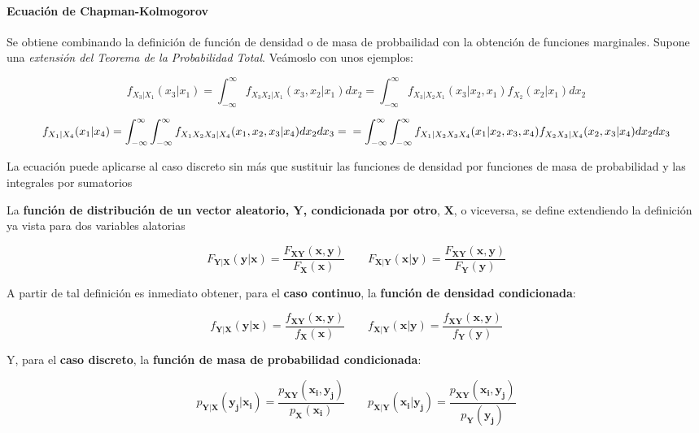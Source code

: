 \documentclass[11pt]{article}
\begin{document}
    \hypertarget{ecuaciuxf3n-de-chapman-kolmogorov}{%
\paragraph{Ecuación de
Chapman-Kolmogorov}\label{ecuaciuxf3n-de-chapman-kolmogorov}}

Se obtiene combinando la definición de función de densidad o de masa de
probbailidad con la obtención de funciones marginales. Supone una
\emph{extensión del Teorema de la Probabilidad Total}. Veámoslo con unos
ejemplos:

\[
f_{X_3 | X_1}(x_3 | x_1) = \int_{-\infty}^{\infty} f_{X_3X_2 | X_1}(x_3, x_2 | x_1) dx_2 =
\int_{-\infty}^{\infty} f_{X_3 | X_2 X_1}(x_3 | x_2 , x_1) f_{X_2}(x_2 | x_1) dx_2
\]

\[
f_{X_1 | X_4}(x_1 | x_4) = \int_{-\infty}^{\infty}\int_{-\infty}^{\infty} f_{X_1 X_2 X_3 | X_4}(x_1 , x_2 , x_3| x_4) dx_2dx_3=\\
= \int_{-\infty}^{\infty}\int_{-\infty}^{\infty} f_{X_1 | X_2 X_3 X_4}(x_1 | x_2 , x_3 , x_4) f_{X_2X_3 | X_4}(x_2, x_3 | x_4) dx_2dx_3
\]

La ecuación puede aplicarse al caso discreto sin más que sustituir las
funciones de densidad por funciones de masa de probabilidad y las
integrales por sumatorios

    La \textbf{función de distribución de un vector aleatorio,
\(\mathbf{Y}\), condicionada por otro}, \(\mathbf{X}\), o viceversa, se
define extendiendo la definición ya vista para dos variables alatorias

\[
F_{\mathbf{Y}|\mathbf{X}}(\mathbf{y}|\mathbf{x}) = \frac{F_{\mathbf{XY}}(\mathbf{x},\mathbf{y})}{F_{\mathbf{X}}(\mathbf{x})} \qquad
F_{\mathbf{X}|\mathbf{Y}}(\mathbf{x}|\mathbf{y}) = \frac{F_{\mathbf{XY}}(\mathbf{x},\mathbf{y})}{F_{\mathbf{Y}}(\mathbf{y})}
\]

A partir de tal definición es inmediato obtener, para el \textbf{caso
continuo}, la \textbf{función de densidad condicionada}:

\[
f_{\mathbf{Y}|\mathbf{X}}(\mathbf{y}|\mathbf{x}) = \frac{f_{\mathbf{XY}}(\mathbf{x},\mathbf{y})}{f_{\mathbf{X}}(\mathbf{x})} \qquad
f_{\mathbf{X}|\mathbf{Y}}(\mathbf{x}|\mathbf{y}) = \frac{f_{\mathbf{XY}}(\mathbf{x},\mathbf{y})}{f_{\mathbf{Y}}(\mathbf{y})}
\]

Y, para el \textbf{caso discreto}, la \textbf{función de masa de
probabilidad condicionada}:

\[
p_{\mathbf{Y}|\mathbf{X}}(\mathbf{y_j}|\mathbf{x_i}) = \frac{p_{\mathbf{XY}}(\mathbf{x_i},\mathbf{y_j})}{p_{\mathbf{X}}(\mathbf{x_i})} \qquad
p_{\mathbf{X}|\mathbf{Y}}(\mathbf{x_i}|\mathbf{y_j}) = \frac{p_{\mathbf{XY}}(\mathbf{x_i},\mathbf{y_j})}{p_{\mathbf{Y}}(\mathbf{y_j})}
\]
\end{document}
